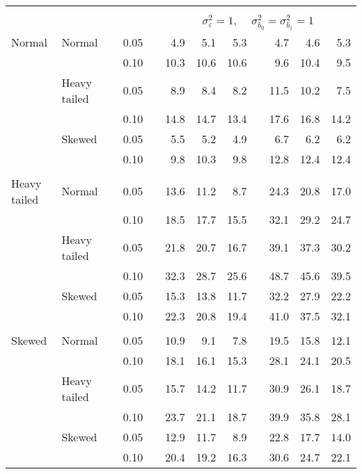 \begin{table}[ht]
\begin{scriptsize}
\begin{tabular}{ll p{.1cm} c p{.1cm} rrr p{.1cm} rrr}
&&&&&&&&&&&\\
& && && \multicolumn{7}{c}{$\sigma_{\varepsilon}^2 = 1$, \ \ $\sigma_{b_0}^2 = \sigma_{b_1}^2 = 1$} \\ \cline{6-12}
\rowcolor{gray!20} Normal & Normal &  & 0.05 &  & 4.9 & 5.1 & 5.3 &  & 4.7 & 4.6 & 5.3 \\ 
\rowcolor{gray!20}    &  &  & 0.10 &  & 10.3 & 10.6 & 10.6 &  & 9.6 & 10.4 & 9.5 \\ 
\rowcolor{gray!20}    & Heavy tailed &  & 0.05 &  & 8.9 & 8.4 & 8.2 &  & 11.5 & 10.2 & 7.5 \\ 
\rowcolor{gray!20}    &  &  & 0.10 &  & 14.8 & 14.7 & 13.4 &  & 17.6 & 16.8 & 14.2 \\ 
\rowcolor{gray!20}    & Skewed &  & 0.05 &  & 5.5 & 5.2 & 4.9 &  & 6.7 & 6.2 & 6.2 \\ 
\rowcolor{gray!20}    &  &  & 0.10 &  & 9.8 & 10.3 & 9.8 &  & 12.8 & 12.4 & 12.4 \\ 
&&&&&&&&&&&\\
  Heavy tailed & Normal &  & 0.05 &  & 13.6 & 11.2 & 8.7 &  & 24.3 & 20.8 & 17.0 \\ 
   &  &  & 0.10 &  & 18.5 & 17.7 & 15.5 &  & 32.1 & 29.2 & 24.7 \\ 
   & Heavy tailed &  & 0.05 &  & 21.8 & 20.7 & 16.7 &  & 39.1 & 37.3 & 30.2 \\ 
   &  &  & 0.10 &  & 32.3 & 28.7 & 25.6 &  & 48.7 & 45.6 & 39.5 \\ 
   & Skewed &  & 0.05 &  & 15.3 & 13.8 & 11.7 &  & 32.2 & 27.9 & 22.2 \\ 
   &  &  & 0.10 &  & 22.3 & 20.8 & 19.4 &  & 41.0 & 37.5 & 32.1 \\ 
&&&&&&&&&&&\\
  Skewed & Normal &  & 0.05 &  & 10.9 & 9.1 & 7.8 &  & 19.5 & 15.8 & 12.1 \\ 
   &  &  & 0.10 &  & 18.1 & 16.1 & 15.3 &  & 28.1 & 24.1 & 20.5 \\ 
   & Heavy tailed &  & 0.05 &  & 15.7 & 14.2 & 11.7 &  & 30.9 & 26.1 & 18.7 \\ 
   &  &  & 0.10 &  & 23.7 & 21.1 & 18.7 &  & 39.9 & 35.8 & 28.1 \\ 
   & Skewed &  & 0.05 &  & 12.9 & 11.7 & 8.9 &  & 22.8 & 17.7 & 14.0 \\ 
   &  &  & 0.10 &  & 20.4 & 19.2 & 16.3 &  & 30.6 & 24.7 & 22.1 \\ 


\end{tabular}
\end{scriptsize}
\end{table}
